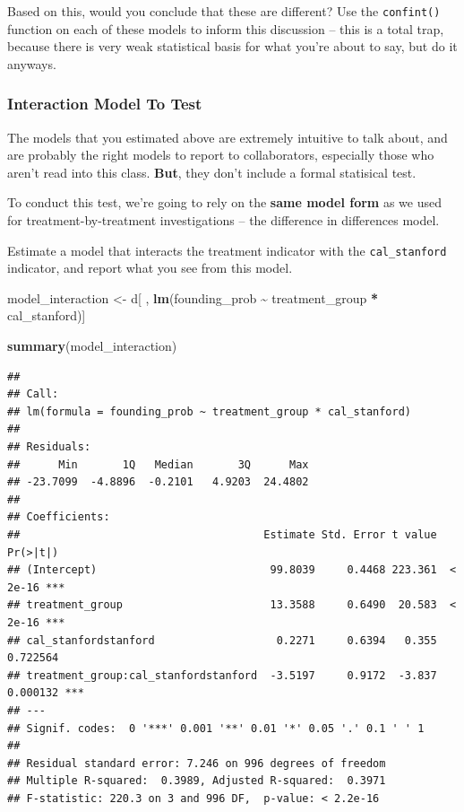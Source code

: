 \documentclass[
]{article}
\newenvironment{Shaded}{\begin{snugshade}}{\end{snugshade}}
\newcommand{\FunctionTok}[1]{\textcolor[rgb]{0.13,0.29,0.53}{\textbf{#1}}}
\newcommand{\NormalTok}[1]{#1}
\newcommand{\OtherTok}[1]{\textcolor[rgb]{0.56,0.35,0.01}{#1}}
\newcommand{\SpecialCharTok}[1]{\textcolor[rgb]{0.81,0.36,0.00}{\textbf{#1}}}
\theoremstyle{definition}
\theoremstyle{definition}
\theoremstyle{definition}
\theoremstyle{definition}
\theoremstyle{remark}
\begin{document}
Based on this, would you conclude that these are different? Use the \texttt{confint()} function on each of these models to inform this discussion -- this is a total trap, because there is very weak statistical basis for what you're about to say, but do it anyways.

\subsubsection{Interaction Model To Test}\label{interaction-model-to-test}

The models that you estimated above are extremely intuitive to talk about, and are probably the right models to report to collaborators, especially those who aren't read into this class. \textbf{But}, they don't include a formal statisical test.

To conduct this test, we're going to rely on the \textbf{same model form} as we used for treatment-by-treatment investigations -- the difference in differences model.

Estimate a model that interacts the treatment indicator with the \texttt{cal\_stanford} indicator, and report what you see from this model.

\begin{Shaded}
\begin{Highlighting}[]
\NormalTok{model\_interaction }\OtherTok{\textless{}{-}}\NormalTok{ d[ , }\FunctionTok{lm}\NormalTok{(founding\_prob }\SpecialCharTok{\textasciitilde{}}\NormalTok{ treatment\_group }\SpecialCharTok{*}\NormalTok{ cal\_stanford)]}

\FunctionTok{summary}\NormalTok{(model\_interaction)}
\end{Highlighting}
\end{Shaded}

\begin{verbatim}
## 
## Call:
## lm(formula = founding_prob ~ treatment_group * cal_stanford)
## 
## Residuals:
##      Min       1Q   Median       3Q      Max 
## -23.7099  -4.8896  -0.2101   4.9203  24.4802 
## 
## Coefficients:
##                                      Estimate Std. Error t value Pr(>|t|)    
## (Intercept)                           99.8039     0.4468 223.361  < 2e-16 ***
## treatment_group                       13.3588     0.6490  20.583  < 2e-16 ***
## cal_stanfordstanford                   0.2271     0.6394   0.355 0.722564    
## treatment_group:cal_stanfordstanford  -3.5197     0.9172  -3.837 0.000132 ***
## ---
## Signif. codes:  0 '***' 0.001 '**' 0.01 '*' 0.05 '.' 0.1 ' ' 1
## 
## Residual standard error: 7.246 on 996 degrees of freedom
## Multiple R-squared:  0.3989, Adjusted R-squared:  0.3971 
## F-statistic: 220.3 on 3 and 996 DF,  p-value: < 2.2e-16
\end{verbatim}
\end{document}
